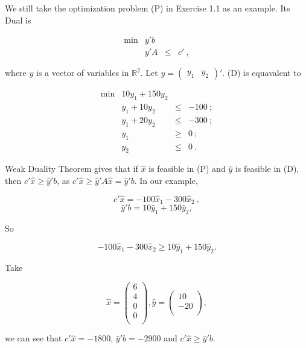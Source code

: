 We still take the optimization problem (P) in Exercise 1.1 as an example. Its Dual is

\[
\begin{array}{rrcl}
 \min & y'b  &      &   \\
      &  y'A  &   \leq  & c'~,
\end{array}
\tag{D}
\]

where $y$ is a vector of variables in $ \mathbb{R}^2$. Let 
$y = 
\left(
\begin{array}{cc}
 y_1 & y_2 
\end{array}
\right)'$. (D) is equavalent to 

\[
\begin{array}{rrcl}
 \min & 10y_1+150y_2  &      &   \\
      &  y_1+10y_2  &   \leq  & -100~; \\
      & y_1 + 20y_2 & \leq & -300~; \\
      & y_1 & \geq & 0~;\\
      & y_2 & \leq & 0~.
\end{array}
\]

Weak Duality Theorem gives that if $\hat{x}$ is feasible in (P) and $\hat{y}$ is feasible in (D), then $c'\hat{x} \geq \hat{y}'b$, as $c'\hat{x} \geq \hat{y}'A\hat{x} = \hat{y}'b$. In our example,

$$c'\hat{x} = -100\hat{x}_1 - 300 \hat{x}_2~,$$
$$\hat{y}'b = 10\hat{y}_1 + 150\hat{y}_2,$$

So

$$-100\hat{x}_1 - 300 \hat{x}_2 \geq 10\hat{y}_1 + 150\hat{y}_2.$$

Take \

$$\hat{x} = 
\left(
\begin{array}{c}
 6 \\
 4 \\
 0 \\
 0 \\
\end{array}
\right),
\hat{y} =
\left(
\begin{array}{c}
 10 \\
 -20 \\
\end{array}
\right),
$$

we can see that $c'\hat{x} = -1800$, $\hat{y}'b = -2900$ and $c'\hat{x} \geq \hat{y}'b$.